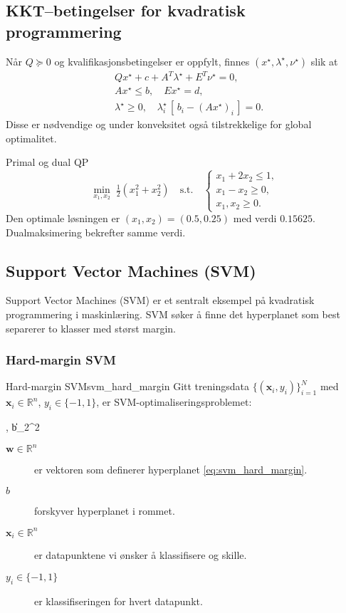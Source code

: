 \subsection{KKT--betingelser for kvadratisk programmering}
Når $Q\succeq0$ og kvalifikasjonsbetingelser er oppfylt, finnes $(x^\star,\lambda^\star,\nu^\star)$ slik at
\begin{align*}
	 & Qx^\star + c + A^T\lambda^\star + E^T\nu^\star = 0,                   \\
	 & A x^\star \le b,\quad E x^\star = d,                                  \\
	 & \lambda^\star\ge0,\quad \lambda_i^\star\,[\,b_i - (A x^\star)_i\,]=0.
\end{align*}
Disse er nødvendige og under konveksitet også tilstrekkelige for global optimalitet.

\begin{example}{Primal og dual QP}{}
	\[
		\min_{x_1,x_2}\;\tfrac12(x_1^2 + x_2^2)
		\quad\text{s.t.}\quad
		\begin{cases}
			x_1 + 2x_2 \le 1, \\
			x_1 - x_2 \ge 0,  \\
			x_1,x_2\ge0.
		\end{cases}
	\]
	Den optimale løsningen er $(x_1,x_2)=(0.5,0.25)$ med verdi $0.15625$. Dualmaksimering bekrefter samme verdi.
\end{example}

\subsection{Support Vector Machines (SVM)}
Support Vector Machines (SVM) er et sentralt eksempel på kvadratisk programmering i maskinlæring. SVM søker å finne det hyperplanet som best separerer to klasser med størst margin.

\subsubsection{Hard-margin SVM}
\begin{definition}{Hard-margin SVM}{svm_hard_margin}
	Gitt treningsdata $\{(\symbf{x}_i, y_i)\}_{i=1}^N$ med $\symbf{x}_i \in \mathbb{R}^n$, $y_i \in \{-1,1\}$, er SVM-optimaliseringsproblemet:
	\begin{mini*}
		{, b}{\|\|_2^2}{}{}
		{\label{eq:svm_hard_margin}}{}
	\end{mini*}
	\begin{description}
		\item[$\symbf{w} \in \mathbb{R}^n$] er vektoren som definerer hyperplanet \eqref{eq:svm_hard_margin}.
		\item[$b$] forskyver hyperplanet i rommet.
		\item[$\symbf{x}_i \in \mathbb{R}^n$] er datapunktene vi ønsker å klassifisere og skille.
		\item[$y_i \in \{-1, 1\}$] er klassifiseringen for hvert datapunkt.
	\end{description}
\end{definition}

